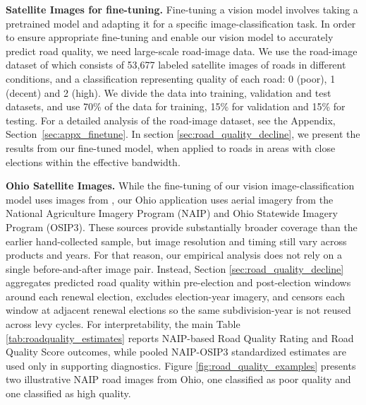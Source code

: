 {\bf Satellite Images for fine-tuning.} Fine-tuning a vision model involves taking a pretrained model and adapting it for a specific image-classification task. 
In order to ensure appropriate fine-tuning and enable our vision model to accurately predict road quality, we need large-scale road-image data. We use the road-image dataset of \cite{brewer2021} which consists of 53,677 labeled satellite images of roads in different conditions, and a classification representing quality of each road: 0 (poor), 1 (decent) and 2 (high). We divide the data into training, validation and test datasets, and use 70\% of the data for training, 15\% for validation and 15\% for testing. 
For a detailed analysis of the road-image dataset, see the Appendix, Section~\ref{sec:appx_finetune}.
In section \ref{sec:road_quality_decline}, we present the results from our fine-tuned model, when applied to roads in areas with close elections within the effective bandwidth. 

{\bf Ohio Satellite Images.} While the fine-tuning of our vision image-classification model uses images from \cite{brewer2021}, our Ohio application uses aerial imagery from the National Agriculture Imagery Program (NAIP) and Ohio Statewide Imagery Program (OSIP3). These sources provide substantially broader coverage than the earlier hand-collected sample, but image resolution and timing still vary across products and years. For that reason, our empirical analysis does not rely on a single before-and-after image pair. Instead, Section \ref{sec:road_quality_decline} aggregates predicted road quality within pre-election and post-election windows around each renewal election, excludes election-year imagery, and censors each window at adjacent renewal elections so the same subdivision-year is not reused across levy cycles. For interpretability, the main Table \ref{tab:roadquality_estimates} reports NAIP-based Road Quality Rating and Road Quality Score outcomes, while pooled NAIP-OSIP3 standardized estimates are used only in supporting diagnostics. Figure \ref{fig:road_quality_examples} presents two illustrative NAIP road images from Ohio, one classified as poor quality and one classified as high quality.


